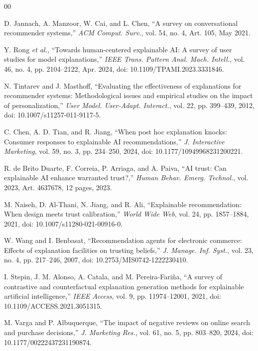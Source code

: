 \documentclass[conference]{IEEEtran}
\begin{document}
\begin{thebibliography}{00}

D. Jannach, A. Manzoor, W. Cai, and L. Chen, ``A survey on conversational
recommender systems,'' \textit{ACM Comput. Surv.}, vol. 54, no. 4, Art. 105,
May 2021.

Y. Rong \textit{et al.}, ``Towards human-centered explainable AI: A survey of user
studies for model explanations,'' \textit{IEEE Trans. Pattern Anal. Mach. Intell.},
vol. 46, no. 4, pp. 2104--2122, Apr. 2024, doi: 10.1109/TPAMI.2023.3331846.

N. Tintarev and J. Masthoff, ``Evaluating the effectiveness of explanations for
recommender systems: Methodological issues and empirical studies on the impact of
personalization,'' \textit{User Model. User-Adapt. Interact.}, vol. 22, pp. 399--439, 2012,
doi: 10.1007/s11257-011-9117-5.

C. Chen, A. D. Tian, and R. Jiang, ``When post hoc explanation knocks: Consumer
responses to explainable AI recommendations,'' \textit{J. Interactive Marketing},
vol. 59, no. 3, pp. 234--250, 2024, doi: 10.1177/10949968231200221.

R. de Brito Duarte, F. Correia, P. Arriaga, and A. Paiva, ``AI trust: Can
explainable AI enhance warranted trust?,'' \textit{Human Behav. Emerg. Technol.},
vol. 2023, Art. 4637678, 12 pages, 2023.

M. Naiseh, D. Al-Thani, N. Jiang, and R. Ali, ``Explainable recommendation: When
design meets trust calibration,'' \textit{World Wide Web}, vol. 24, pp. 1857--1884,
2021, doi: 10.1007/s11280-021-00916-0.

W. Wang and I. Benbasat, ``Recommendation agents for electronic commerce: Effects of
explanation facilities on trusting beliefs,'' \textit{J. Manage. Inf. Syst.},
vol. 23, no. 4, pp. 217--246, 2007, doi: 10.2753/MIS0742-1222230410.

I. Stepin, J. M. Alonso, A. Catala, and M. Pereira-Fari\~{n}a, ``A survey of
contrastive and counterfactual explanation generation methods for explainable
artificial intelligence,'' \textit{IEEE Access}, vol. 9, pp. 11974--12001, 2021,
doi: 10.1109/ACCESS.2021.3051315.

M. Varga and P. Albuquerque, ``The impact of negative reviews on online search and
purchase decisions,'' \textit{J. Marketing Res.}, vol. 61, no. 5, pp. 803--820,
2024, doi: 10.1177/00222437231190874.


\end{thebibliography}
\end{document}
